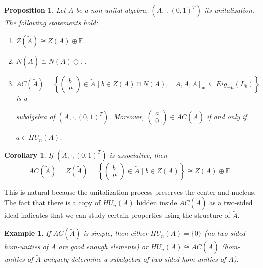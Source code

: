 \documentclass[12pt]{article}
\newtheorem{proposition}[theorem]{Proposition}
\newtheorem{corollary}[theorem]{Corollary}
\newtheorem{example}[theorem]{Example}
\begin{document}
		\begin{proposition}\label{HU_unitalization}
			Let $A$ be a non-unital algebra, $(\tilde{A},\cdot, (0,1)^T)$ its unitalization. The following statements hold:
			\begin{enumerate}[label=\textnormal{\arabic*)}]
				\item $Z(\tilde{A})\cong Z(A)\oplus \mathbb{F}$.
				\item $N(\tilde{A})\cong N(A)\oplus\mathbb{F}$.
				\item $AC(\tilde{A})=\left\{\begin{pmatrix}
					b \\ \mu
				\end{pmatrix}\in\tilde{A}\mid b\in Z(A)\cap N(A),\ [A,A,A]_{\mathrm{as}}\subseteq Eig_{-\mu}(L_b)\right\}$ is a
				
				subalgebra of $(\tilde{A},\cdot, (0,1)^T)$. Moreover, $\begin{pmatrix}
					a \\0
				\end{pmatrix}\in AC(\tilde{A})$ if and only if
				
				$a\in HU_n(A)$.
			\end{enumerate}
		\end{proposition}
		\begin{corollary}
			If $(\tilde{A},\cdot, (0,1)^T)$ is associative, then
			\begin{equation*}
				AC(\tilde{A})=Z(\tilde{A})=\left\{\begin{pmatrix}
					b \\ \mu
				\end{pmatrix}\in\tilde{A}\mid b\in Z(A)\right\}\cong Z(A)\oplus\mathbb{F}.
			\end{equation*}
		\end{corollary}
		This is natural because the unitalization process preserves the center and nucleus.
		The fact that there is a copy of $HU_n(A)$ hidden inside $AC(\tilde{A})$ as a two-sided ideal indicates that we can study certain properties using the structure of $\tilde{A}$.
		\begin{example}
			If $AC(\tilde{A})$ is simple, then either $HU_n(A)= \{0\}$ (no two-sided hom-unities of $A$ are \textnormal{good enough} elements) or $HU_n(A)\cong AC(\tilde{A})$ (hom-unities of $\tilde{A}$ uniquely determine a subalgebra of two-sided hom-unities of $A$).
		\end{example}
		
\end{document}
